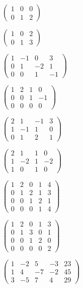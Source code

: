 \documentclass[12pt]{exam}
\theoremstyle{definition}
\begin{document}
\begin{questions}

\question $\begin{pmatrix}
1 & 0 & 0 \\
0 & 1 & 2 
\end{pmatrix}$

\question $\begin{pmatrix}
1 & 0 & 2 \\
0 & 1 & 3
\end{pmatrix}$

\question $\begin{pmatrix}
1 & -1 & 0 & 3 \\
0 & 1 & -2 & 1 \\
0 & 0 & 1 & -1 
\end{pmatrix}$

\question $\begin{pmatrix}
1 & 2 & 1 & 0 \\
0 & 0 & 1 & -1 \\
0 & 0 & 0 & 0
\end{pmatrix}$

\question $\begin{pmatrix}
2 & 1 & -1 & 3 \\
1 & -1 & 1 & 0 \\
0 & 1 & 2 & 1 
\end{pmatrix}$

\question $\begin{pmatrix}
2 & 1 & 1 & 0 \\
1 & -2 & 1 & -2 \\
1 & 0 & 1 & 0
\end{pmatrix}$

\question $\begin{pmatrix}
1 & 2 & 0 & 1 & 4 \\
0 & 1 & 2 & 1 & 3 \\
0 & 0 & 1 & 2 & 1 \\
0 & 0 & 0 & 1 &4
\end{pmatrix}$

\question $\begin{pmatrix}
1 & 2 & 0 & 1 & 3 \\
0 & 1 & 3 & 0 & 1 \\
0 & 0 & 1 & 2 & 0 \\
0 & 0 & 0 & 0 & 2
\end{pmatrix}$

\question $\begin{pmatrix}
1 & -2 & 5 & -3 & 23 \\
1 & 4 & -7 & -2 & 45 \\
3 & -5 & 7 & 4 & 29
\end{pmatrix}$


\end{questions}
\end{document}
